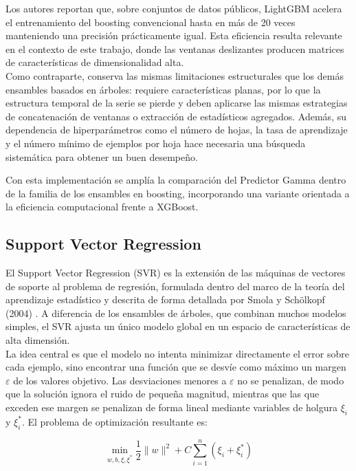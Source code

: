 Los autores reportan que, sobre conjuntos de datos públicos, LightGBM acelera el entrenamiento del boosting convencional hasta en más de 20 veces manteniendo una precisión prácticamente igual. Esta eficiencia resulta relevante en el contexto de este trabajo, donde las ventanas deslizantes producen matrices de características de dimensionalidad alta.\\[.15cm]

Como contraparte, conserva las mismas limitaciones estructurales que los demás ensambles basados en árboles: requiere características planas, por lo que la estructura temporal de la serie se pierde y deben aplicarse las mismas estrategias de concatenación de ventanas o extracción de estadísticos agregados. Además, su dependencia de hiperparámetros como el número de hojas, la tasa de aprendizaje y el número mínimo de ejemplos por hoja hace necesaria una búsqueda sistemática para obtener un buen desempeño.

Con esta implementación se amplía la comparación del Predictor Gamma dentro de la familia de los ensambles en boosting, incorporando una variante orientada a la eficiencia computacional frente a XGBoost.

\subsection{Support Vector Regression}

El Support Vector Regression (SVR) es la extensión de las máquinas de vectores de soporte al problema de regresión, formulada dentro del marco de la teoría del aprendizaje estadístico y descrita de forma detallada por Smola y Schölkopf (2004) \cite{smola2004}. A diferencia de los ensambles de árboles, que combinan muchos modelos simples, el SVR ajusta un único modelo global en un espacio de características de alta dimensión.\\[.15cm]

La idea central es que el modelo no intenta minimizar directamente el error sobre cada ejemplo, sino encontrar una función que se desvíe como máximo un margen $\varepsilon$ de los valores objetivo. Las desviaciones menores a $\varepsilon$ no se penalizan, de modo que la solución ignora el ruido de pequeña magnitud, mientras que las que exceden ese margen se penalizan de forma lineal mediante variables de holgura $\xi_i$ y $\xi_i^{*}$. El problema de optimización resultante es:

\[
\min_{w,b,\xi,\xi^{*}} \frac{1}{2}\lVert w \rVert^{2} + C \sum_{i=1}^{n} \left(\xi_i + \xi_i^{*}\right)
\]

